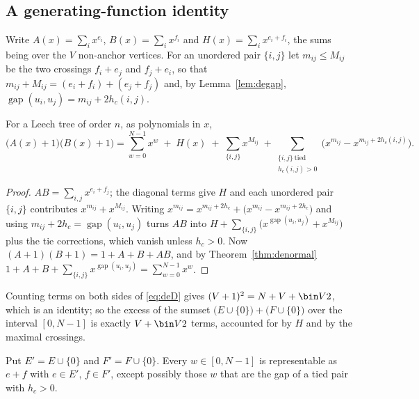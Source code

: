 \subsection{A generating-function identity}\label{sec:de:lemmad}

Write $A(x)=\sum_i x^{e_i}$, $B(x)=\sum_i x^{f_i}$ and
$H(x)=\sum_i x^{e_i+f_i}$, the sums being over the $V$ non-anchor vertices.  For
an unordered pair $\{i,j\}$ let $m_{ij}\le M_{ij}$ be the two crossings
$f_i+e_j$ and $f_j+e_i$, so that
$m_{ij}+M_{ij}=(e_i+f_i)+(e_j+f_j)$ and, by Lemma~\ref{lem:degap},
$\operatorname{gap}(u_i,u_j)=m_{ij}+2h_c(i,j)$.

\begin{lemma}\label{lem:deD}
For a Leech tree of order $n$, as polynomials in $x$,
\begin{equation}\label{eq:deD}
  \bigl(A(x)+1\bigr)\bigl(B(x)+1\bigr)
  =\sum_{w=0}^{N-1}x^{w}\;+\;H(x)\;+\;\sum_{\{i,j\}}x^{M_{ij}}
   \;+\!\!\sum_{\substack{\{i,j\}\ \mathrm{tied}\\ h_c(i,j)>0}}\!\!
     \bigl(x^{m_{ij}}-x^{m_{ij}+2h_c(i,j)}\bigr).
\end{equation}
\end{lemma}

\begin{proof}
$AB=\sum_{i,j}x^{e_i+f_j}$; the diagonal terms give $H$ and each unordered pair
$\{i,j\}$ contributes $x^{m_{ij}}+x^{M_{ij}}$.  Writing
$x^{m_{ij}}=x^{m_{ij}+2h_c}+\bigl(x^{m_{ij}}-x^{m_{ij}+2h_c}\bigr)$ and using
$m_{ij}+2h_c=\operatorname{gap}(u_i,u_j)$ turns $AB$ into
$H+\sum_{\{i,j\}}\bigl(x^{\operatorname{gap}(u_i,u_j)}+x^{M_{ij}}\bigr)$ plus
the tie corrections, which vanish unless $h_c>0$.  Now
$(A+1)(B+1)=1+A+B+AB$, and by Theorem~\ref{thm:denormal}
$1+A+B+\sum_{\{i,j\}}x^{\operatorname{gap}(u_i,u_j)}=\sum_{w=0}^{N-1}x^w$.
\end{proof}

Counting terms on both sides of \eqref{eq:deD} gives
$(V+1)^2=N+V+\bin V2$, which is an identity; so the excess of the sumset
$\bigl(E\cup\{0\}\bigr)+\bigl(F\cup\{0\}\bigr)$ over the interval $[0,N-1]$ is
exactly $V+\bin V2$ terms, accounted for by $H$ and by the maximal crossings.

\begin{corollary}[covering]\label{cor:decover}
Put $E'=E\cup\{0\}$ and $F'=F\cup\{0\}$.  Every $w\in[0,N-1]$ is representable
as $e+f$ with $e\in E'$, $f\in F'$, except possibly those $w$ that are the gap
of a tied pair with $h_c>0$.
\end{corollary}


